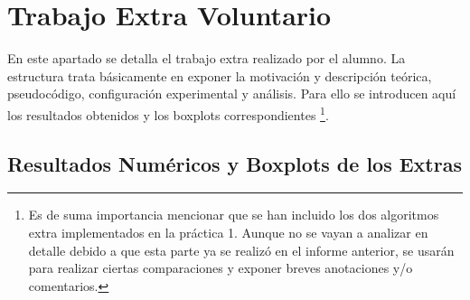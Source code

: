 \newpage
\section{Trabajo Extra Voluntario}
\label{sec:trabajo_extra}

En este apartado se detalla el trabajo extra realizado por el alumno. La estructura trata básicamente en exponer la motivación y descripción teórica, pseudocódigo, configuración experimental y análisis. Para ello se introducen aquí los resultados obtenidos y los boxplots correspondientes \footnote{Es de suma importancia mencionar que se han incluido los dos algoritmos extra implementados en la práctica 1. Aunque no se vayan a analizar en detalle debido a que esta parte ya se realizó en el informe anterior, se usarán para realizar ciertas comparaciones y exponer breves anotaciones y/o comentarios.}.

\subsection{Resultados Numéricos y Boxplots de los Extras}

\begin{table}[H]
\centering
\caption{Resultados extras -- IBEX 35}
\label{tab:extras-ibex35}
\end{table}

\begin{table}[H]
\centering
\caption{Resultados extras -- S\&P 100}
\label{tab:extras-sp100}
\end{table}

